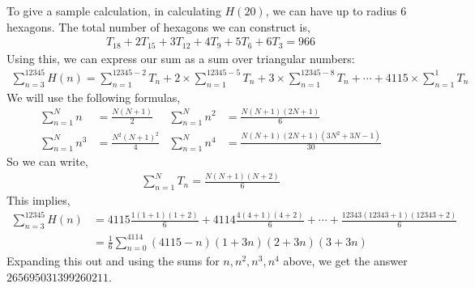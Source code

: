 \documentclass{article}
\begin{document}
To give a sample calculation, in calculating $H(20)$, we can have up to radius 6 hexagons.
The total number of hexagons we can construct is,
\begin{align*}
	T_{18} + 2T_{15} + 3 T_{12} + 4 T_{9} + 5 T_{6} + 6 T_{3} = 966
\end{align*}
Using this, we can express our sum as a sum over triangular numbers:
\begin{align*}
	\sum_{n=3}^{12345} H(n) = \sum_{n=1}^{12345-2} T_n + 2\times \sum_{n=1}^{12345-5}T_n + 3 \times \sum_{n=1}^{12345-8} T_n + \cdots + 4115 \times \sum_{n=1}^1 T_n
\end{align*}
We will use the following formulas,
\begin{align*}
	\sum_{n=1}^N n &= \frac{N(N+1)}{2} & \sum_{n=1}^N n^2 &= \frac{N(N+1)(2N+1)}{6} \\
	\sum_{n=1}^N n^3 &= \frac{N^2 (N+1)^2}{4} & \sum_{n=1}^N n^4 &= \frac{N(N+1)(2N+1)(3N^2 + 3N - 1)}{30}
\end{align*}
So we can write,
\begin{align*}
	\sum_{n=1}^N T_n = \frac{N(N+1)(N+2)}{6}
\end{align*}
This implies,
\begin{align*}
	\sum_{n=3}^{12345} H(n) &= 4115 \frac{1(1+1)(1+2)}{6} + 4114 \frac{4(4+1)(4+2)}{6} + \cdots +\frac{12343(12343+1)(12343+2)}{6} \\
	&= \frac{1}{6} \sum_{n=0}^{4114} (4115-n)(1+3n)(2+3n)(3+3n)
\end{align*}
Expanding this out and using the sums for $n, n^2, n^3, n^4$ above, we get the answer $\boxed{ 265695031399260211}$.
\end{document}
